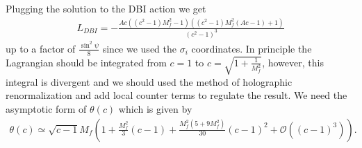 \documentclass[11pt]{article}
\begin{document}
Plugging the solution to the DBI action we get
\begin{align}
L_{DBI} = -\frac{A c \left(\left(c^2-1\right) M_f^2-1\right) \left(\left(c^2-1\right) M_f^2 (A c-1)+1\right)}{\left(c^2-1\right)^3}
\end{align}
up to a factor of $\frac{\sin^2\psi}{8}$ since we used the $\sigma_i$ coordinates.
In principle the Lagrangian should be integrated from $c = 1$ to $c = \sqrt{1 + \frac{1}{M_f^2}}$, however, this integral is divergent and we should used the method of holographic renormalization and add local counter terms to regulate the result.
We need the asymptotic form of $\theta(c)$ which is given by
\begin{align}
\theta(c) \simeq \sqrt{c-1}M_f\left(1 + \frac{M_f^2}{3}(c-1) + \frac{M_f^2(5+9M_f^2)}{30}(c-1)^2 + \mathcal{O}((c-1)^3)\right).
\end{align}
\end{document}
